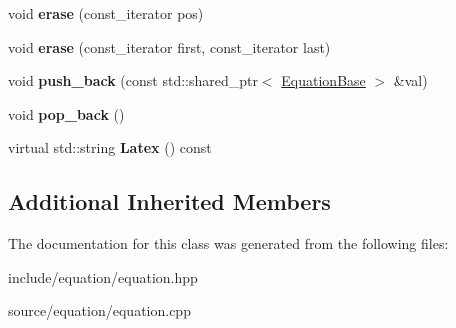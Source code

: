 \begin{DoxyCompactItemize}
void {\bfseries erase} (const\+\_\+iterator pos)
\item 
\mbox{\label{classradix_1_1Equation_a47f65d0d976760f41e75a3b2ce084c94}} 
void {\bfseries erase} (const\+\_\+iterator first, const\+\_\+iterator last)
\item 
\mbox{\label{classradix_1_1Equation_ada8ce44d7f5d9e82613b16e0e1023629}} 
void {\bfseries push\+\_\+back} (const std\+::shared\+\_\+ptr$<$ \hyperlink{classradix_1_1EquationBase}{Equation\+Base} $>$ \&val)
\item 
\mbox{\label{classradix_1_1Equation_a7657e48a6520c21e15cd4e52a6261bca}} 
void {\bfseries pop\+\_\+back} ()
\item 
\mbox{\label{classradix_1_1Equation_ab07495c0e6420d7063d0133849743c4f}} 
virtual std\+::string {\bfseries Latex} () const
\end{DoxyCompactItemize}
\subsection*{Additional Inherited Members}


The documentation for this class was generated from the following files\+:\begin{DoxyCompactItemize}
\item 
include/equation/equation.\+hpp\item 
source/equation/equation.\+cpp\end{DoxyCompactItemize}
